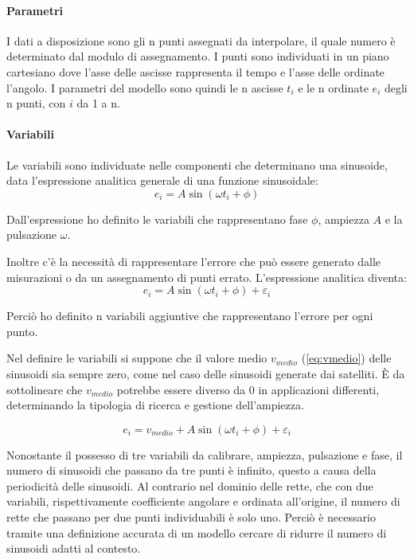 \documentclass[a4paper,12pt]{report}
\begin{document}
\paragraph{Parametri}
\label{p:parametri}
I dati a disposizione sono gli n punti assegnati da interpolare, il quale numero è determinato dal modulo di assegnamento. I punti sono individuati in un piano cartesiano dove l'asse delle ascisse rappresenta il tempo e l'asse delle ordinate l'angolo. I parametri del modello sono quindi le n ascisse $t_i$ e le n ordinate $e_i$ degli n punti, con $i$ da 1 a n.



\paragraph{Variabili}
\label{p:variabili}
Le variabili sono individuate nelle componenti che determinano una sinusoide, data l'espressione analitica generale di una funzione sinusoidale:
\begin{equation}
e_i = A\sin(\omega t_i + \phi)
\end{equation}

Dall'espressione ho definito le variabili che rappresentano fase $ \phi $, ampiezza $ A $  e la pulsazione $\omega$.

Inoltre c'è la necessità di rappresentare l'errore che può essere generato dalle misurazioni o da un assegnamento di punti errato. L'espressione analitica diventa:
\begin{equation}
\label{vin:sin}
e_i = A\sin(\omega t_i + \phi) + \varepsilon_i
\end{equation}

Perciò ho definito n variabili aggiuntive che rappresentano l'errore per ogni punto.

Nel definire le variabili si suppone che il valore medio $v_{medio}$ (\ref{eq:vmedio}) delle sinusoidi sia sempre zero, come nel caso delle sinusoidi generate dai satelliti. È da sottolineare che $v_{medio}$ potrebbe essere diverso da 0 in applicazioni differenti, determinando la tipologia di ricerca e gestione dell'ampiezza.

\begin{equation}
  \label{eq:vmedio}
  e_i = v_{medio} + A\sin(\omega t_i + \phi) + \varepsilon_i
\end{equation}

Nonostante il possesso di tre variabili da calibrare, ampiezza, pulsazione e fase, il numero di sinusoidi che passano da tre punti è infinito, questo a causa della periodicità delle sinusoidi. Al contrario nel dominio delle rette, che con due variabili, rispettivamente coefficiente angolare e ordinata all'origine, il numero di rette che passano per due punti individuabili è solo uno.
Perciò è necessario tramite una definizione accurata di un modello cercare di ridurre il numero di sinusoidi adatti al contesto.
\end{document}
